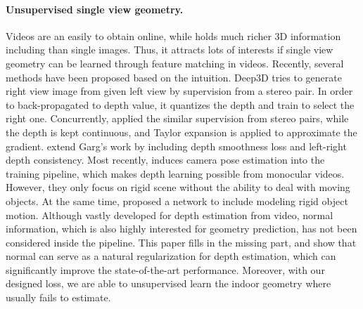 \paragraph{Unsupervised single view geometry.}
Videos are an easily to obtain online, while holds much richer 3D information including than single images. Thus, it attracts lots of interests if single view geometry can be learned through feature matching in videos. Recently, several methods have been proposed based on the intuition. Deep3D \cite{xie2016deep3d} tries to generate right view image from given left view by supervision from a stereo pair. In order to back-propagated to depth value, it quantizes the depth and train to select the right one. 
Concurrently, \cite{GargBR16} applied the similar supervision from stereo pairs, while the depth is kept continuous, and Taylor expansion is applied to approximate the gradient. \cite{godard2016unsupervised} extend Garg's work by including depth smoothness loss and left-right depth consistency. Most recently, \cite{zhou2017unsupervised} induces camera pose estimation into the training pipeline, which makes depth learning possible from monocular videos. However, they only focus on rigid scene without the ability to deal with moving objects. At the same time, \cite{kuznietsov2017semi} proposed a network to include modeling rigid object motion. Although vastly developed for depth estimation from video, normal information, which is also highly interested for geometry prediction, has not been considered inside the pipeline. This paper fills in the missing part, and show that normal can serve as a natural regularization for depth estimation, which can significantly improve the state-of-the-art performance. Moreover, with our designed loss, we are able to unsupervised learn the indoor geometry where \cite{zhou2017unsupervised} usually fails to estimate.

